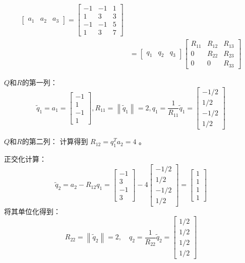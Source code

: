 \begin{example}
    $$
\begin{aligned}
\left[\begin{array}{lll}
a_{1} & a_{2} & a_{3}
\end{array}\right]=\left[\begin{array}{rrr}
-1 & -1 & 1 \\
1 & 3 & 3 \\
-1 & -1 & 5 \\
1 & 3 & 7
\end{array}\right] \\
&=\left[\begin{array}{lll}
q_{1} & q_{2} & q_{3}
\end{array}\right]\left[\begin{array}{ccc}
R_{11} & R_{12} & R_{13} \\
0 & R_{22} & R_{23} \\
0 & 0 & R_{33}
\end{array}\right]
\end{aligned}
$$

$Q$和$R$的第一列：
$$
\tilde{q}_{1}=a_{1}=\left[\begin{array}{r}
-1 \\
1 \\
-1 \\
1
\end{array}\right],  R_{11}=\left\|\tilde{q}_{1}\right\|=2,  q_{1}=\frac{1}{R_{11}} \tilde{q}_{1}=\left[\begin{array}{r}
-1 / 2 \\
1 / 2 \\
-1 / 2 \\
1 / 2
\end{array}\right]
$$

$Q$和$R$的第二列：
计算得到 $R_{12}=q_{1}^{T} a_{2}=4$ 。

正交化计算：
$$
\tilde{q}_{2}=a_{2}-R_{12} q_{1}=\left[\begin{array}{r}
-1 \\
3 \\
-1 \\
3
\end{array}\right]-4\left[\begin{array}{c}
-1 / 2 \\
1 / 2 \\
-1 / 2 \\
1 / 2
\end{array}\right]=\left[\begin{array}{l}
1 \\
1 \\
1 \\
1
\end{array}\right]
$$
将其单位化得到：
$$
R_{22}=\left\|\tilde{q}_{2}\right\|=2, \quad q_{2}=\frac{1}{R_{22}} \tilde{q}_{2}=\left[\begin{array}{c}
1 / 2 \\
1 / 2 \\
1 / 2 \\
1 / 2
\end{array}\right]
$$


\end{example}
